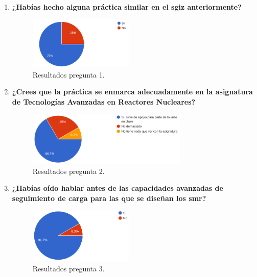 \begin{enumerate}
    \item \textbf{¿Habías hecho alguna práctica similar en el \acrshort{sgiz} anteriormente?}
    
    \begin{figure}[!h]
        \centering
        \includegraphics[width=0.47\textwidth]{content/figures/encuesta_1.png}
        \caption{Resultados pregunta 1.}
        \label{fig:encuesta_1}
    \end{figure}

    \item \textbf{¿Crees que la práctica se enmarca adecuadamente en la asignatura de Tecnologías Avanzadas en Reactores Nucleares?}
    
    \begin{figure}[!h]
        \centering
        \includegraphics[width=0.72\textwidth]{content/figures/encuesta_2.png}
        \caption{Resultados pregunta 2.}
        \label{fig:encuesta_2}
    \end{figure}
    
    \item \textbf{¿Habías oído hablar antes de las capacidades avanzadas de seguimiento de carga para las que se diseñan los \acrlong{smr}?}
    
    \begin{figure}[!h]
        \centering
        \includegraphics[width=0.47\textwidth]{content/figures/encuesta_3.png}
        \caption{Resultados pregunta 3.}
        \label{fig:encuesta_3}
    \end{figure}
    

\end{enumerate}
